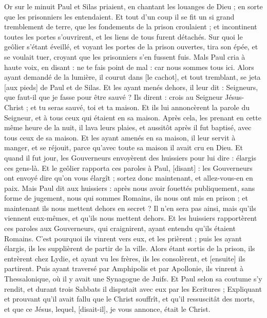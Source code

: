 \begin{multicols}{2}
Or sur le minuit Paul et Silas priaient, en chantant les louanges de Dieu ; en sorte que les prisonniers les entendaient.
Et tout d'un coup il se fit un si grand tremblement de terre, que les fondements de la prison croulaient ; et incontinent toutes les portes s'ouvrirent, et les liens de tous furent détachés.
Sur quoi le geôlier s'étant éveillé, et voyant les portes de la prison ouvertes, tira son épée, et se voulait tuer, croyant que les prisonniers s'en fussent fuis.
Mals Paul cria à haute voix, en disant : ne te fais point de mal : car nous sommes tous ici.
Alors ayant demandé de la lumière, il courut dans [le cachot], et tout tremblant, se jeta [aux pieds] de Paul et de Silas.
Et les ayant menés dehors, il leur dit : Seigneurs, que faut-il que je fasse pour être sauvé ?
Ils dirent : crois au Seigneur Jésus-Christ ; et tu seras sauvé, toi et ta maison.
Et ils lui annoncèrent la parole du Seigneur, et à tous ceux qui étaient en sa maison.
Après cela, les prenant en cette même heure de la nuit, il lava leurs plaies, et aussitôt après il fut baptisé, avec tous ceux de sa maison.
Et les ayant amenés en sa maison, il leur servit à manger, et se réjouit, parce qu'avec toute sa maison il avait cru en Dieu.
Et quand il fut jour, les Gouverneurs envoyèrent des huissiers pour lui dire : élargis ces gens-là.
Et le geôlier rapporta ces paroles à Paul, [disant] : les Gouverneurs ont envoyé dire qu'on vous élargît ; sortez donc maintenant, et allez-vous-en en paix.
Mais Paul dit aux huissiers : après nous avoir fouettés publiquement, sans forme de jugement, nous qui sommes Romains, ils nous ont mis en prison ; et maintenant ils nous mettent dehors en secret ? Il n'en sera pas ainsi, mais qu'ils viennent eux-mêmes, et qu'ils nous mettent dehors.
Et les huissiers rapportèrent ces paroles aux Gouverneurs, qui craignirent, ayant entendu qu'ils étaient Romains.
C'est pourquoi ils vinrent vers eux, et les prièrent ; puis les ayant élargis, ils les supplièrent de partir de la ville.
Alors étant sortis de la prison, ils entrèrent chez Lydie, et ayant vu les frères, ils les consolèrent, et [ensuite] ils partirent.
\VerseOne{}Puis ayant traversé par Amphipolis et par Apollonie, ils vinrent à Thessalonique, où il y avait une Synagogue de Juifs.
Et Paul selon sa coutume s'y rendit, et durant trois Sabbats il disputait avec eux par les Ecritures ;
Expliquant et prouvant qu'il avait fallu que le Christ souffrît, et qu'il ressuscitât des morts, et que ce Jésus, lequel, [disait-il], je vous annonce, était le Christ.

\end{multicols}
